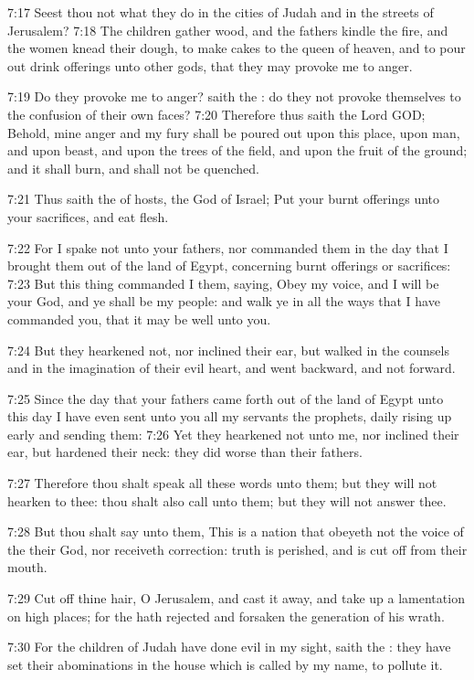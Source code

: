 7:17 Seest thou not what they do in the cities of Judah and in the
streets of Jerusalem?  7:18 The children gather wood, and the fathers
kindle the fire, and the women knead their dough, to make cakes to the
queen of heaven, and to pour out drink offerings unto other gods, that
they may provoke me to anger.

7:19 Do they provoke me to anger? saith the \LORD: do they not provoke
themselves to the confusion of their own faces?  7:20 Therefore thus
saith the Lord GOD; Behold, mine anger and my fury shall be poured out
upon this place, upon man, and upon beast, and upon the trees of the
field, and upon the fruit of the ground; and it shall burn, and shall
not be quenched.

7:21 Thus saith the \LORD of hosts, the God of Israel; Put your burnt
offerings unto your sacrifices, and eat flesh.

7:22 For I spake not unto your fathers, nor commanded them in the day
that I brought them out of the land of Egypt, concerning burnt
offerings or sacrifices: 7:23 But this thing commanded I them, saying,
Obey my voice, and I will be your God, and ye shall be my people: and
walk ye in all the ways that I have commanded you, that it may be well
unto you.

7:24 But they hearkened not, nor inclined their ear, but walked in the
counsels and in the imagination of their evil heart, and went
backward, and not forward.

7:25 Since the day that your fathers came forth out of the land of
Egypt unto this day I have even sent unto you all my servants the
prophets, daily rising up early and sending them: 7:26 Yet they
hearkened not unto me, nor inclined their ear, but hardened their
neck: they did worse than their fathers.

7:27 Therefore thou shalt speak all these words unto them; but they
will not hearken to thee: thou shalt also call unto them; but they
will not answer thee.

7:28 But thou shalt say unto them, This is a nation that obeyeth not
the voice of the \LORD their God, nor receiveth correction: truth is
perished, and is cut off from their mouth.

7:29 Cut off thine hair, O Jerusalem, and cast it away, and take up a
lamentation on high places; for the \LORD hath rejected and forsaken
the generation of his wrath.

7:30 For the children of Judah have done evil in my sight, saith the
\LORD: they have set their abominations in the house which is called by
my name, to pollute it.

